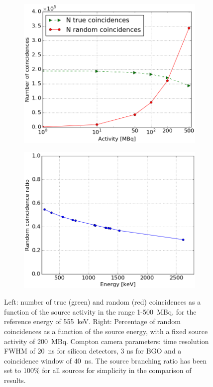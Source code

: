 \begin{figure}
\begin{subfigure}[t]{.45\textwidth}
\centering
  \includegraphics[width=.95\linewidth]{03_GraphicFiles/chapter4/SPECT/compton/timing/CoincidenceCounts}
  \label{fig:timing_counts}
\end{subfigure}
\begin{subfigure}[t]{.45\textwidth}
\centering
  \includegraphics[width=.95\linewidth]{03_GraphicFiles/chapter4/SPECT/compton/timing/randomRatioVSenergy}
  \label{fig:timing_energy}
\end{subfigure}
\caption{Left: number of true (green) and random (red) coincidences as a function of the source activity in the range 1-500~MBq, for the reference energy of 555~keV. Right: Percentage of random coincidences as a function of the source energy, with a fixed source activity of 200~MBq. Compton camera parameters: time resolution FWHM of 20~ns for silicon detectors, 3 ns for BGO and a coincidence window of 40~ns. The source branching ratio has been set to 100\% for all sources for simplicity in the comparison of results.}
\label{timig_en_coinc}
\end{figure} 

